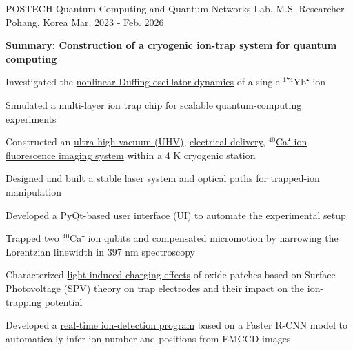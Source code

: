 

\begin{cventries}
  \cventry
    {POSTECH  Quantum Computing and Quantum Networks Lab.} %
    {M.S. Researcher} %
    {Pohang, Korea} %
    {Mar. 2023 - Feb. 2026} %
    {
      {\textbf{Summary: Construction of a cryogenic ion-trap system for quantum computing}}
      \vspace{\baselineskip}
      \begin{cvitems} %
        \vspace{0.1 cm}
        \setlength{\itemsep}{0.2 em}
        \item {Investigated the \underline{nonlinear Duffing oscillator dynamics} of a single $^{174}$Yb⁺ ion}
        \item {Simulated a \underline{multi-layer ion trap chip} for scalable quantum-computing experiments}
        \item {Constructed an \underline{ultra-high vacuum (UHV)}, \underline{electrical delivery}, \underline{$^{40}$Ca⁺ ion fluorescence imaging system} within a 4 K cryogenic station}
        \item {Designed and built a \underline{stable laser system} and \underline{optical paths} for trapped-ion manipulation}
        \item {Developed a PyQt-based \underline{user interface (UI)} to automate the experimental setup}
        \item {Trapped \underline{two $^{40}$Ca⁺ ion qubits} and compensated micromotion by narrowing the Lorentzian linewidth in 397 nm spectroscopy}
        \item {Characterized \underline{light-induced charging effects} of oxide patches based on Surface Photovoltage (SPV) theory on trap electrodes and their impact on the ion-trapping potential}
        \item {Developed a \underline{real-time ion-detection program} based on a Faster R-CNN model to automatically infer ion number and positions from EMCCD images}
      \end{cvitems}
    }
  \vspace{\baselineskip}


\end{cventries}
